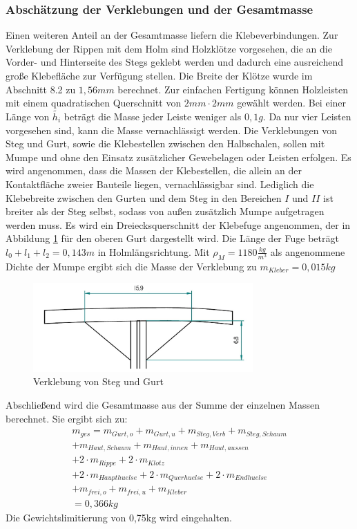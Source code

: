 \subsubsection{Abschätzung der Verklebungen und der Gesamtmasse}
Einen weiteren Anteil an der Gesamtmasse liefern die Klebeverbindungen. Zur Verklebung der Rippen mit dem Holm sind Holzklötze vorgesehen, die an die Vorder- und Hinterseite des Stegs geklebt werden und dadurch eine ausreichend große Klebefläche zur Verfügung stellen. Die Breite der Klötze wurde im Abschnitt 8.2 zu $ 1,56mm $ berechnet. Zur einfachen Fertigung können Holzleisten mit einem quadratischen Querschnitt von $ 2mm\cdot2mm $ gewählt werden. Bei einer Länge von $ \tilde{h_{i}} $ beträgt die Masse jeder Leiste weniger als $ 0,1g $. Da nur vier Leisten vorgesehen sind, kann die Masse vernachlässigt werden. Die Verklebungen von Steg und Gurt, sowie die Klebestellen zwischen den Halbschalen, sollen mit Mumpe und ohne den Einsatz zusätzlicher Gewebelagen oder Leisten erfolgen. Es wird angenommen, dass die Massen der Klebestellen, die allein an der Kontaktfläche zweier Bauteile liegen, vernachlässigbar sind. Lediglich die Klebebreite zwischen den Gurten und dem Steg in den Bereichen $ I $ und $ II $ ist breiter als der Steg selbst, sodass von außen zusätzlich Mumpe aufgetragen werden muss. Es wird ein Dreiecksquerschnitt der Klebefuge angenommen, der in Abbildung \ref{fig: Mumpe} für den oberen Gurt dargestellt wird. Die Länge der Fuge beträgt $ l_{0}+l_{1}+l_{2}=0,143m $ in Holmlängsrichtung. Mit $ \rho_{M}=1180\frac{kg}{m^{3}} $ als angenommene Dichte der Mumpe ergibt sich die Masse der Verklebung zu $ m_{Kleber}=0,015kg $\\

\begin{figure}[h]
	\includegraphics[width=0.75\textwidth]{Bilder/Mumpe.jpg}
	\centering
	\caption{Verklebung von Steg und Gurt}
	\label{fig: Mumpe}
\end{figure}

\noindent Abschließend wird die Gesamtmasse aus der Summe der einzelnen Massen berechnet. Sie ergibt sich zu:
\begin{equation}
\begin{array}{l}
	m_{ges}= m_{Gurt,o}+m_{Gurt,u}+m_{Steg,Verb}+m_{Steg,Schaum} \\ +m_{Haut,Schaum}+m_{Haut,innen}+m_{Haut,aussen} \\ +2\cdot m_{Rippe}+2\cdot m_{Klotz} \\
	+2\cdot m_{Haupthuelse}+2\cdot m_{Querhuelse}+2\cdot m_{Endhuelse}\\
	+m_{frei,o}+m_{frei,u}+m_{Kleber}\\
	=0,366kg
\end{array}  
\end{equation}
Die Gewichtslimitierung von 0,75kg wird eingehalten.

